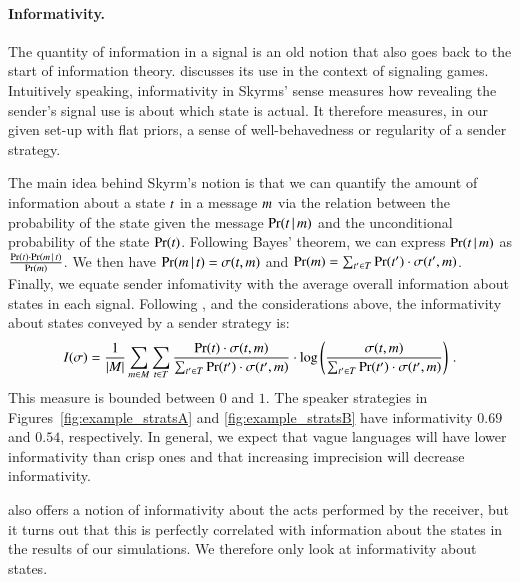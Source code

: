 \paragraph{Informativity.} The quantity of information in a signal is
an old notion that also goes back to the start of information theory.
\citet[ch.~3]{Skyrms2010:Signals} discusses its use in the context of
signaling games. Intuitively speaking, informativity in Skyrms' sense
measures how revealing the sender's signal use is about which state is
actual. It therefore measures, in our given set-up with flat priors, a
sense of well-behavedness or regularity of a sender strategy.

The main idea behind Skyrm's notion is that we can quantify the amount
of information about a state $t$ in a message $m$ via the
relation between the probability of the state given the message
$\Pr(t \,|\, m)$ and the unconditional probability of the
state $\Pr(t)$.  Following Bayes' theorem, we can express
$\Pr(t \,|\, m)$ as $\frac{\Pr(t) \cdot \Pr(m
  \,|\, t)}{\Pr(m)}$.  We then have $\Pr(m \,|\,
t) = \sigma(t,m)$ and $\Pr(m) =
\sum_{t^\prime \in T} \Pr(t^\prime) \cdot
\sigma(t^\prime,m)$.  Finally, we equate sender
infomativity with the average overall information about states in each
signal.  Following \citet[p.~36]{Skyrms2010:Signals}, and the
considerations above, the informativity about states conveyed by a
sender strategy is:
\begin{align*}
  I(\sigma) = \frac{1}{|M|} \sum_{m \in M}
  \sum_{t \in T} \frac{\Pr(t) \cdot
    \sigma(t,m)}{\sum_{t^\prime \in T}
    \Pr(t^\prime) \cdot \sigma(t^\prime,m)} \cdot \log
  \left(\frac{\sigma(t,m)}{\sum_{t^\prime \in T}
      \Pr(t^\prime) \cdot \sigma(t^\prime,m)} \right)
  \,. 
\end{align*}
This measure is bounded between $0$ and $1$. The speaker strategies in
Figures~\ref{fig:example_stratsA} and \ref{fig:example_stratsB} have
informativity $0.69$ and $0.54$, respectively. In general, we expect
that vague languages will have lower informativity than crisp
ones and that increasing imprecision will decrease informativity. 

\citet[p.~39]{Skyrms2010:Signals} also offers a notion of
informativity about the acts performed by the receiver, but it turns
out that this is perfectly correlated with information about the
states in the results of our simulations. We therefore only look at
informativity about states. 

